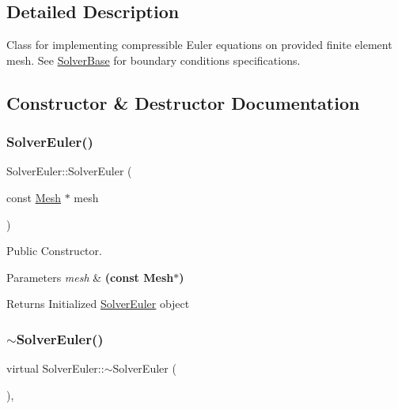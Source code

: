 \subsection{Detailed Description}
Class for implementing compressible Euler equations on provided finite element mesh. See \mbox{\hyperlink{class_solver_base}{Solver\+Base}} for boundary conditions specifications. 

\subsection{Constructor \& Destructor Documentation}
\mbox{\label{class_solver_euler_a636fce8aa919afe62be090e99d9346bf}} 
\subsubsection{\texorpdfstring{Solver\+Euler()}{SolverEuler()}}
{\footnotesize\ttfamily Solver\+Euler\+::\+Solver\+Euler (\begin{DoxyParamCaption}\item[{const \mbox{\hyperlink{class_mesh}{Mesh}} $\ast$}]{mesh }\end{DoxyParamCaption})}



Public Constructor. 


\begin{DoxyParams}{Parameters}
{\em mesh} & {\bfseries (const Mesh$\ast$)} \\
\hline
\end{DoxyParams}
\begin{DoxyReturn}{Returns}
Initialized \mbox{\hyperlink{class_solver_euler}{Solver\+Euler}} object 
\end{DoxyReturn}
\mbox{\label{class_solver_euler_a16777db2c518c46a6c41f5437376e479}} 
\subsubsection{\texorpdfstring{$\sim$\+Solver\+Euler()}{~SolverEuler()}}
{\footnotesize\ttfamily virtual Solver\+Euler\+::$\sim$\+Solver\+Euler (\begin{DoxyParamCaption}{ }\end{DoxyParamCaption})\hspace{0.3cm}{\ttfamily [inline]}, {\ttfamily [virtual]}}



